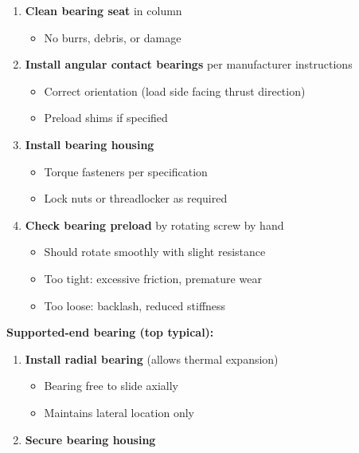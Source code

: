 \documentclass[
]{article}
\providecommand{\tightlist}{%
  \setlength{\itemsep}{0pt}\setlength{\parskip}{0pt}}
\begin{document}
\begin{enumerate}
\def\labelenumi{\arabic{enumi}.}
\tightlist
\item
  \textbf{Clean bearing seat} in column

  \begin{itemize}
  \tightlist
  \item
    No burrs, debris, or damage
  \end{itemize}
\item
  \textbf{Install angular contact bearings} per manufacturer
  instructions

  \begin{itemize}
  \tightlist
  \item
    Correct orientation (load side facing thrust direction)
  \item
    Preload shims if specified
  \end{itemize}
\item
  \textbf{Install bearing housing}

  \begin{itemize}
  \tightlist
  \item
    Torque fasteners per specification
  \item
    Lock nuts or threadlocker as required
  \end{itemize}
\item
  \textbf{Check bearing preload} by rotating screw by hand

  \begin{itemize}
  \tightlist
  \item
    Should rotate smoothly with slight resistance
  \item
    Too tight: excessive friction, premature wear
  \item
    Too loose: backlash, reduced stiffness
  \end{itemize}
\end{enumerate}

\textbf{Supported-end bearing (top typical):}

\begin{enumerate}
\def\labelenumi{\arabic{enumi}.}
\tightlist
\item
  \textbf{Install radial bearing} (allows thermal expansion)

  \begin{itemize}
  \tightlist
  \item
    Bearing free to slide axially
  \item
    Maintains lateral location only
  \end{itemize}
\item
  \textbf{Secure bearing housing}
\end{enumerate}
\end{document}
